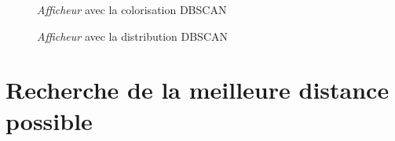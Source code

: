 \documentclass[12pt]{report}
\begin{document}
\begin{figure}[h]
\begin{center}
\end{center}
\caption{\textit{Afficheur} avec la colorisation DBSCAN}
\end{figure}

\begin{figure}[h]
\begin{center}
\end{center}
\caption{\textit{Afficheur} avec la distribution DBSCAN}
\end{figure}

\chapter*{Recherche de la meilleure distance possible}

\end{document}
